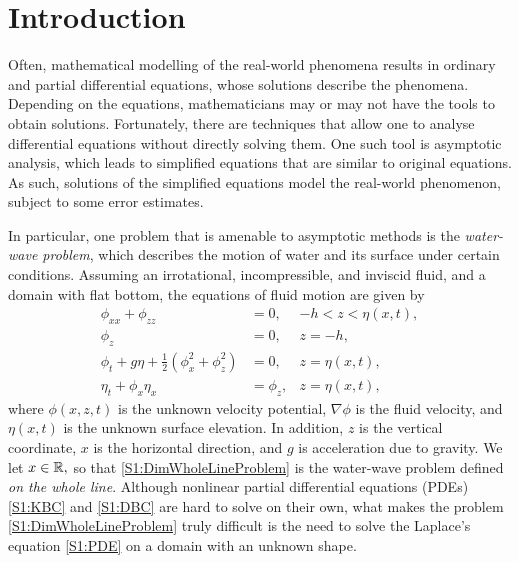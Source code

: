 
\chapter{Introduction} %

\label{chapter1} %

Often, mathematical modelling of the real-world phenomena results in ordinary and partial differential equations, whose solutions describe the phenomena. Depending on the equations, mathematicians may or may not have the tools to obtain solutions. Fortunately, there are techniques that allow one to analyse differential equations without directly solving them. One such tool is asymptotic analysis, which leads to simplified equations that are similar to original equations. As such, solutions of the simplified equations model the real-world phenomenon, subject to some error estimates.

In particular, one problem that is amenable to asymptotic methods is the \textit{water-wave problem}, which describes the motion of water and its surface under certain conditions. Assuming an irrotational, incompressible, and inviscid fluid, and a domain with flat bottom, the equations of fluid motion are given by
\begin{subequations} \label{S1:DimWholeLineProblem}
\begin{align}
\phi_{xx} + \phi_{zz} &= 0, &-h < z < \eta(x,t), \label{S1:PDE}\\
\phi_{z} &= 0, &z = -h, \label{S1:BBC}\\
\phi_t + g\eta + \frac{1}{2}(\phi_{x}^2 + \phi_{z}^2) &= 0, &z = \eta(x,t), \label{S1:DBC} \\
\eta_t + \phi_{x}\eta_{x} &= \phi_{z}, & z = \eta(x,t), \label{S1:KBC}
\end{align}
\end{subequations}
where $\phi(x,z,t)$ is the unknown velocity potential, $\nabla \phi$ is the fluid velocity, and $\eta(x,t)$ is the unknown surface elevation. In addition, $z$ is the vertical coordinate, $x$ is the horizontal direction, and $g$ is acceleration due to gravity. We let $x\in\mathbb R,$ so that \eqref{S1:DimWholeLineProblem} is the water-wave problem defined \textit{on the whole line}. Although nonlinear partial differential equations (PDEs) \eqref{S1:KBC} and \eqref{S1:DBC} are hard to solve on their own, what makes the problem \eqref{S1:DimWholeLineProblem} truly difficult is the need to solve the Laplace's equation \eqref{S1:PDE} on a domain with an unknown shape. 

